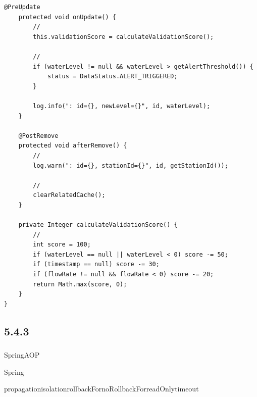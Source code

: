\begin{lstlisting}[style=java]
    @PreUpdate
    protected void onUpdate() {
        // 
        this.validationScore = calculateValidationScore();
        
        // 
        if (waterLevel != null && waterLevel > getAlertThreshold()) {
            status = DataStatus.ALERT_TRIGGERED;
        }
        
        log.info(": id={}, newLevel={}", id, waterLevel);
    }
    
    @PostRemove
    protected void afterRemove() {
        // 
        log.warn(": id={}, stationId={}", id, getStationId());
        
        // 
        clearRelatedCache();
    }
    
    private Integer calculateValidationScore() {
        // 
        int score = 100;
        if (waterLevel == null || waterLevel < 0) score -= 50;
        if (timestamp == null) score -= 30;
        if (flowRate != null && flowRate < 0) score -= 20;
        return Math.max(score, 0);
    }
}
\end{lstlisting}

\hypertarget{section-63}{%
\subsection{5.4.3}\label{section-63}}

\hypertarget{section-64}{%
\subsubsection{}\label{section-64}}

SpringAOP

Spring

\important{}propagationisolationrollbackFornoRollbackForreadOnlytimeout

